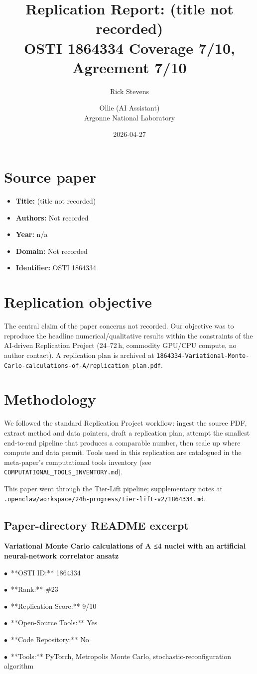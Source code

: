 \documentclass[11pt]{article}
\title{Replication Report: (title not recorded)\\[2pt]\large OSTI 1864334 \textbar{} Coverage 7/10, Agreement 7/10}
\author{Rick Stevens \and Ollie (AI Assistant)\\\small Argonne National Laboratory}
\date{2026-04-27}
\begin{document}
\maketitle

\section{Source paper}
\begin{itemize}
\item \textbf{Title:} (title not recorded)
\item \textbf{Authors:} Not recorded
\item \textbf{Year:} n/a
\item \textbf{Domain:} Not recorded
\item \textbf{Identifier:} OSTI 1864334
\end{itemize}


\section{Replication objective}
The central claim of the paper concerns not recorded. Our objective was to reproduce the headline numerical/qualitative results within the constraints of the AI-driven Replication Project (24--72\,h, commodity GPU/CPU compute, no author contact). A replication plan is archived at \texttt{1864334-Variational-Monte-Carlo-calculations-of-A/replication\_plan.pdf}.

\section{Methodology}
We followed the standard Replication Project workflow: ingest the source PDF, extract method and data pointers, draft a replication plan, attempt the smallest end-to-end pipeline that produces a comparable number, then scale up where compute and data permit. Tools used in this replication are catalogued in the meta-paper's computational tools inventory (see \texttt{COMPUTATIONAL\_TOOLS\_INVENTORY.md}).

This paper went through the Tier-Lift pipeline; supplementary notes at \texttt{.openclaw/workspace/24h-progress/tier-lift-v2/1864334.md}.

\subsection*{Paper-directory README excerpt}
\small
\par\medskip\textbf{Variational Monte Carlo calculations of A ≤4 nuclei with an artificial neural-network correlator ansatz}\par
\par$\bullet$\ **OSTI ID:** 1864334
\par$\bullet$\ **Rank:** \#23
\par$\bullet$\ **Replication Score:** 9/10
\par$\bullet$\ **Open-Source Tools:** Yes
\par$\bullet$\ **Code Repository:** No
\par$\bullet$\ **Tools:** PyTorch, Metropolis Monte Carlo, stochastic-reconfiguration algorithm
\end{document}
